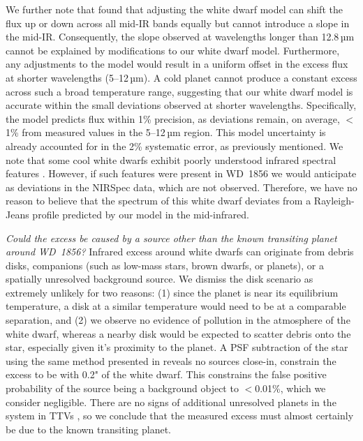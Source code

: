 \documentclass[twocolumn]{aastex631}
\begin{document}
{ 

We further note that \cite{2024ApJ...973L..11L} found that adjusting the white dwarf model can shift the flux up or down across all mid-IR bands equally but cannot introduce a slope in the mid-IR. Consequently, the slope observed at wavelengths longer than 12.8\,µm cannot be explained by modifications to our white dwarf model. Furthermore, any adjustments to the model would result in a uniform offset in the excess flux at shorter wavelengths (5–12\,µm). A cold planet cannot produce a constant excess across such a broad temperature range, suggesting that our white dwarf model is accurate within the small deviations observed at shorter wavelengths. Specifically, the model predicts flux within 1\% precision, as deviations remain, on average, $<$1\% from measured values in the 5–12\,µm region. This model uncertainty is already accounted for in the 2\% systematic error, as previously mentioned. We note that some cool white dwarfs exhibit poorly understood infrared spectral features \citep{2024arXiv240916224B}. However, if such features were present in WD~1856 we would anticipate as deviations in the NIRSpec data, which are not observed. Therefore, we have no reason to believe that the spectrum of this white dwarf deviates from a Rayleigh-Jeans profile predicted by our model in the mid-infrared.


{\it Could the excess be caused by a source other than the known transiting planet around WD~1856?} Infrared excess around white dwarfs can originate from debris disks, companions (such as low-mass stars, brown dwarfs, or planets), or a spatially unresolved background source. We dismiss the disk scenario as extremely unlikely for two reasons: (1) since the planet is near its equilibrium temperature, a disk at a similar temperature would need to be at a comparable separation, and (2) we observe no evidence of pollution in the atmosphere of the white dwarf, whereas a nearby disk would be expected to scatter debris onto the star, especially given it's proximity to the planet. A PSF subtraction of the star using the same method presented in \cite{2024ApJ...973L..11L} reveals no sources close-in, constrain the excess to be with 0.2" of the white dwarf. This constrains the false positive probability of the source being a background object to $<$0.01\%, which we consider negligible. There are no signs of additional unresolved planets in the system in TTVs \cite{2023MNRAS.521.4679K}, so we conclude that the measured excess must almost certainly be due to the known transiting planet.
}
\end{document}
